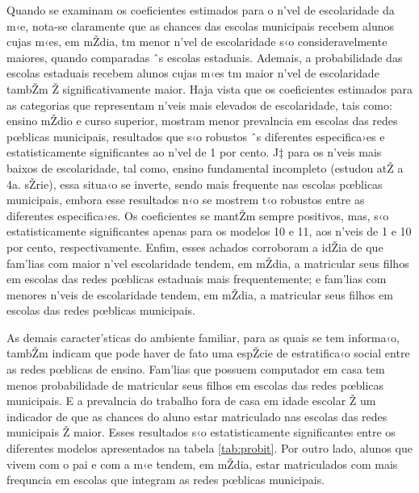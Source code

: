 \documentclass[a4paper, 12pt]{article}
\begin{document}
Quando se examinam os coeficientes estimados para o n’vel de escolaridade da m‹e, nota-se claramente que as chances das escolas municipais recebem alunos cujas m‹es, em mŽdia,  tm menor n’vel de escolaridade s‹o consideravelmente maiores, quando comparadas ˆs escolas estaduais. Ademais, a probabilidade das escolas estaduais recebem alunos cujas m‹es tm maior n’vel de escolaridade tambŽm Ž significativamente maior. Haja vista  que os coeficientes estimados para as categorias que representam n’veis mais elevados de escolaridade, tais como: ensino mŽdio e curso superior, mostram menor prevalncia em escolas das redes pœblicas municipais, resultados que s‹o robustos ˆs diferentes especifica›es e estatisticamente significantes ao n’vel de 1 por cento. J‡ para os n’veis mais baixos de escolaridade, tal como, ensino fundamental incompleto (estudou atŽ a 4a. sŽrie), essa situa‹o se inverte, sendo mais frequente nas escolas pœblicas municipais, embora esse resultados n‹o se mostrem t‹o robustos entre as diferentes especifica›es. Os coeficientes se mantŽm sempre positivos, mas, s‹o estatisticamente significantes apenas para os modelos 10 e 11, aos n’veis de 1 e 10 por cento, respectivamente. Enfim, esses achados corroboram a idŽia de que fam’lias com maior n’vel escolaridade tendem, em mŽdia, a matricular seus filhos em escolas das redes pœblicas estaduais mais frequentemente; e fam’lias com menores n’veis de escolaridade tendem, em mŽdia, a matricular seus filhos em escolas das redes pœblicas municipais.

As demais caracter’sticas do ambiente familiar, para as quais se tem informa‹o, tambŽm indicam que pode haver de fato uma espŽcie de estratifica‹o social entre as redes pœblicas de ensino. Fam’lias que possuem computador em casa tem menos probabilidade de matricular seus filhos em escolas das redes pœblicas municipais. E a prevalncia do trabalho fora de casa em idade escolar Ž um indicador de que as chances do aluno estar matriculado nas escolas das redes municipais Ž maior. Esses resultados s‹o estatisticamente significantes entre os diferentes modelos  apresentados na tabela \ref{tab:probit}. Por outro lado, alunos que vivem com o pai e com a m‹e tendem, em mŽdia, estar matriculados com mais frequncia em escolas que integram as redes pœblicas municipais. 
\end{document}
